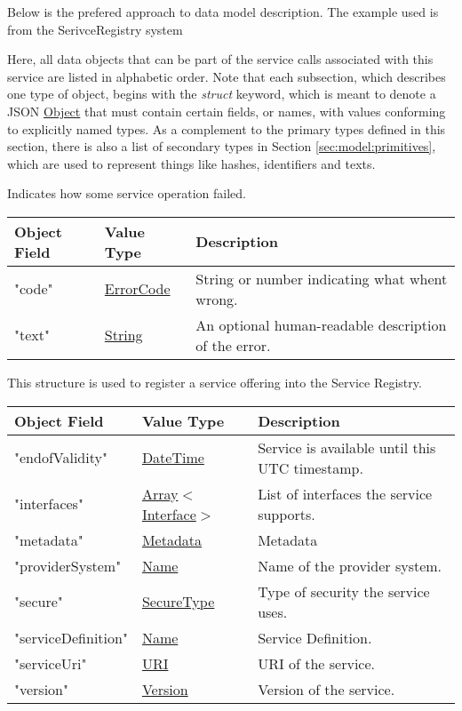 \documentclass[a4paper]{arrowhead}
\newcommand{\pref}[1]{{\textcolor{ArrowheadGrey}{\hyperref[sec:model:primitives:#1]{#1}}}}
\begin{document}
\color{red}
Below is the prefered approach to data model description.
The example used is from the SerivceRegistry system

Here, all data objects that can be part of the service calls associated with this service are listed in alphabetic order.
Note that each subsection, which describes one type of object, begins with the \textit{struct} keyword, which is meant to denote a JSON \pref{Object} that must contain certain fields, or names, with values conforming to explicitly named types.
As a complement to the primary types defined in this section, there is also a list of secondary types in Section \ref{sec:model:primitives}, which are used to represent things like hashes, identifiers and texts.


Indicates how some service operation failed.

\begin{table}[ht!]
\begin{tabularx}{\textwidth}{| p{4.25cm} | p{3.5cm} | X |} \hline
\rowcolor{gray!33} Object Field & Value Type       & Description \\ \hline
"code"                          & \pref{ErrorCode} & String or number indicating what whent wrong. \\ \hline
"text"                          & \pref{String}    & An optional human-readable description of the error. \\ \hline
\end{tabularx}
\end{table}


This structure is used to register a service offering into the Service Registry.

\begin{table}[ht!]
\begin{tabularx}{\textwidth}{| p{4.25cm} | p{3.5cm} | X |} \hline
\rowcolor{gray!33} Object Field & Value Type      & Description \\ \hline
"endofValidity"                 & \pref{DateTime} & Service is available until this UTC timestamp. \\ \hline
"interfaces"                   & \pref{Array}$<$\pref{Interface}$>$     & List of interfaces the service supports. \\ \hline
"metadata"                  & \pref{Metadata}     & Metadata \\ \hline
"providerSystem"                    & \pref{Name} & Name of the provider system. \\ \hline
"secure"                    &\pref{SecureType}  & Type of security the service uses. \\ \hline
"serviceDefinition"         &\pref{Name}        & Service Definition. \\ \hline
"serviceUri"                &\pref{URI}         & URI of the service. \\ \hline
"version"                   &\pref{Version}     & Version of the service. \\ \hline
\end{tabularx}
\end{table}
\end{document}
